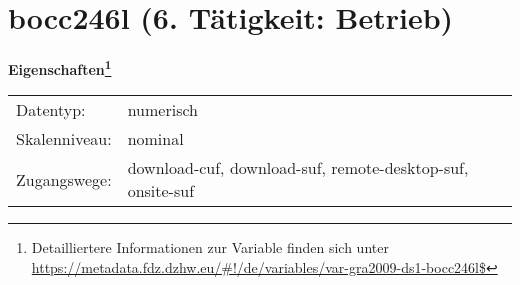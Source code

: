 
    \setcounter{footnote}{0}

    \vspace*{-1.8cm}
	\section{bocc246l (6. Tätigkeit: Betrieb)}
	\label{section:bocc246l}



    \vspace*{0.5cm}
    \noindent\textbf{Eigenschaften\footnote{Detailliertere Informationen zur Variable finden sich unter
		\url{https://metadata.fdz.dzhw.eu/\#!/de/variables/var-gra2009-ds1-bocc246l$}}}\\
	\begin{tabularx}{\hsize}{@{}lX}
	Datentyp: & numerisch \\
	Skalenniveau: & nominal \\
	Zugangswege: &
	  download-cuf, 
	  download-suf, 
	  remote-desktop-suf, 
	  onsite-suf
 \\
    \end{tabularx}



